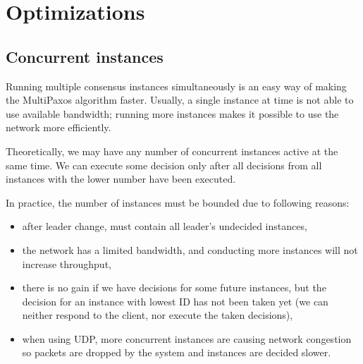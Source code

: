 \chapter{Optimizations}

\section{Concurrent instances}
\label{subsec:concurrent_instances}
Running multiple consensus instances simultaneously is an easy way of making the MultiPaxos algorithm faster. Usually, a single instance at time is not able to use available bandwidth; running more instances makes it possible to use the network more efficiently.

Theoretically, we may have any number of concurrent instances active at the same time. We can execute some decision only after all decisions from all instances with the lower number have been executed.

In practice, the number of instances must be bounded due to following reasons:
\begin{itemize} 
  \item after leader change, \prepareOK must contain all leader's undecided instances,
  \item the network has a limited bandwidth, and conducting more instances will not increase throughput,
  \item there is no gain if we have decisions for some future instances, but the decision for an instance with lowest ID has not been taken yet (we can neither respond to the client, nor execute the taken decisions),
  \item when using UDP, more concurrent instances are causing network congestion so packets are dropped by the system and instances are decided slower.
\end{itemize}

